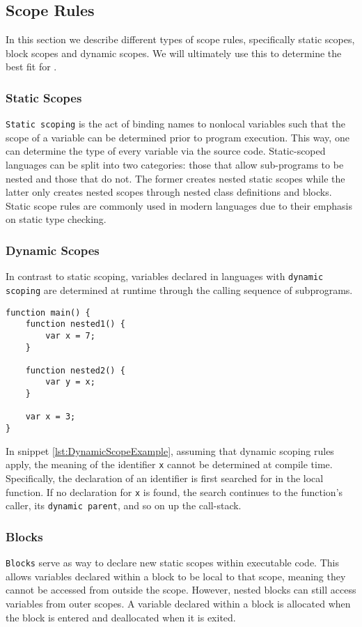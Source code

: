 \subsection{Scope Rules}
In this section we describe different types of scope rules, specifically static scopes, block scopes and dynamic scopes.
We will ultimately use this to determine the best fit for \dazel{}.

\subsubsection{Static Scopes}
\texttt{Static scoping} is the act of binding names to nonlocal variables such that the scope of a variable
can be determined prior to program execution. This way, one can determine the type of every variable via the source code.
Static-scoped languages can be split into two categories: those that allow sub-programs to be nested and those that do not.
The former creates nested static scopes while the latter only creates nested scopes through nested class definitions and blocks.
Static scope rules are commonly used in modern languages due to their emphasis on static type checking\cite{sebesta_concepts_2016}.

\subsubsection{Dynamic Scopes}
In contrast to static scoping, variables declared in languages with \texttt{dynamic scoping} are determined at runtime through the calling sequence of subprograms.

\begin{lstlisting}[caption={Example of dynamic scoping}, label={lst:DynamicScopeExample}]
function main() {
	function nested1() {
		var x = 7;
	}
	
	function nested2() {
		var y = x;
	}

	var x = 3;
}
\end{lstlisting}

In snippet \ref{lst:DynamicScopeExample}, assuming that dynamic scoping rules apply, the meaning of the identifier \texttt{x} cannot be determined at compile time.
Specifically, the declaration of an identifier is first searched for in the local function.
If no declaration for \texttt{x} is found, the search continues to the function's caller, its \texttt{dynamic parent}, and so on up the call-stack\cite{sebesta_concepts_2016}.

\subsubsection{Blocks}
\texttt{Blocks} serve as way to declare new static scopes within executable code.
This allows variables declared within a block to be local to that scope, meaning they cannot be accessed from outside the scope.
However, nested blocks can still access variables from outer scopes.
A variable declared within a block is allocated when the block is entered and deallocated when it is exited\cite{sebesta_concepts_2016}.

